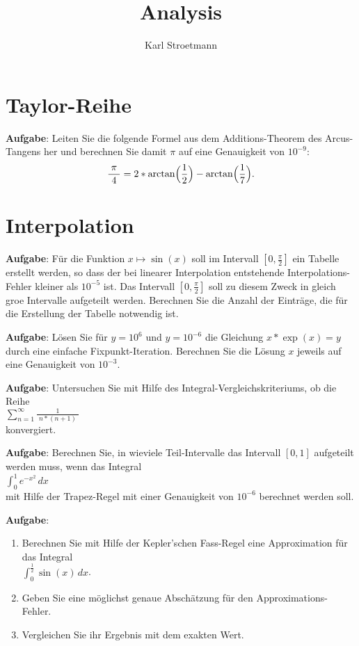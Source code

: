 \documentclass{article}
\title{Analysis}
\author{Karl Stroetmann}
\newcommand{\bruch}[2]{\displaystyle\frac{\;\displaystyle#1\;}{\;\displaystyle#2\;}}
\begin{document}
\noindent
\section{Taylor-Reihe}
\textbf{Aufgabe}: Leiten Sie die folgende Formel aus dem Additions-Theorem des
Arcus-Tangens her und berechnen Sie damit $\pi$ auf eine Genauigkeit von $10^{-9}$:
\begin{equation}
  \label{eq:Pi}
  \bruch{\pi}{4} =  2 * \arctan\Bigl(\frac{1}{2}\Bigr) -\arctan\Bigl(\frac{1}{7}\Bigr).  
\end{equation}


\section{Interpolation}
\textbf{Aufgabe}: F\"ur die Funktion $x \mapsto \sin(x)$ soll im Intervall
$[0,\frac{\pi}{2}]$ ein Tabelle erstellt werden, so dass der bei linearer Interpolation entstehende
Interpolations-Fehler kleiner als $10^{-5}$ ist.  Das Intervall $[0,\frac{\pi}{2}]$ soll zu diesem
Zweck in gleich gro\3e Intervalle aufgeteilt werden.  Berechnen Sie die Anzahl der
Eintr\"age, die f\"ur die Erstellung der Tabelle notwendig ist.
\vspace*{0.3cm}


\noindent
\textbf{Aufgabe}: L\"osen Sie f\"ur $y=10^6$ und $y=10^{-6}$ die Gleichung $x*\exp(x) = y$ 
durch eine einfache Fixpunkt-Iteration.  Berechnen Sie die L\"osung $x$ jeweils auf eine
Genauigkeit von $10^{-3}$.
\vspace*{0.3cm}


\noindent
\textbf{Aufgabe}: Untersuchen Sie mit Hilfe des Integral-Vergleichskriteriums, ob die
Reihe 
\\[0.1cm]
\hspace*{1.3cm}
$\displaystyle \sum\limits_{n=1}^\infty \bruch{1}{n*(n+1)}$ 
\\[0.3cm]
konvergiert.
\vspace*{0.3cm}
\pagebreak

\noindent
\textbf{Aufgabe}:  Berechnen Sie, in wieviele Teil-Intervalle das Intervall $[0,1]$
aufgeteilt werden muss, wenn das Integral
\\[0.1cm]
\hspace*{1.3cm}
$\displaystyle \int_0^1 e^{-x^2}\, dx$
\\[0.1cm]
mit Hilfe der Trapez-Regel mit einer Genauigkeit von $10^{-6}$ berechnet werden soll.
\vspace*{0.3cm}

\noindent
\textbf{Aufgabe}: 
\begin{enumerate}
\item Berechnen Sie mit Hilfe der Kepler'schen Fass-Regel eine Approximation 
      f\"ur das Integral 
      \\[0.1cm]
      \hspace*{1.3cm}$\displaystyle \int_0^{\frac{1}2} \sin(x)\, dx$.
\item Geben Sie eine m\"oglichst genaue Absch\"atzung f\"ur den Approximations-Fehler.
\item Vergleichen Sie ihr Ergebnis mit dem exakten Wert.
\end{enumerate}
\vspace*{0.3cm}
\end{document}

